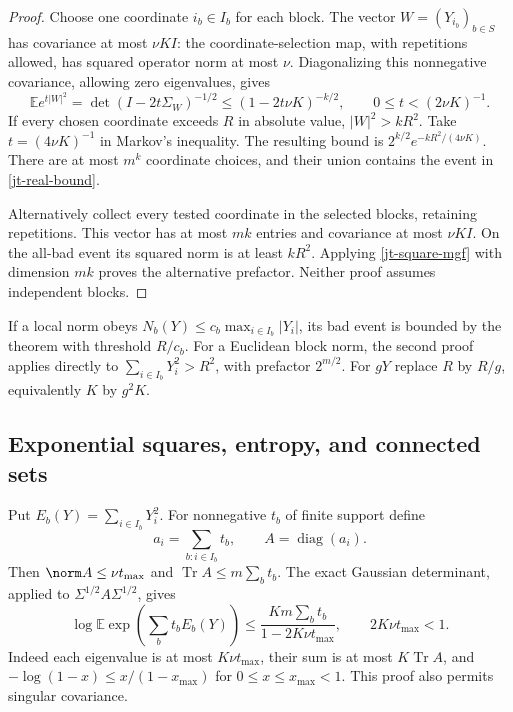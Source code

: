 \begin{proof}
Choose one coordinate $i_b\in I_b$ for each block. The vector
$W=(Y_{i_b})_{b\in S}$ has covariance at most $\nu K I$:
the coordinate-selection map, with repetitions allowed, has
squared operator norm at most $\nu$. Diagonalizing this
nonnegative covariance, allowing zero eigenvalues, gives
\begin{equation}\label{jt-square-mgf}
 \mathbb E e^{t|W|^2}
 =\det(I-2t\Sigma_W)^{-1/2}
 \le(1-2t\nu K)^{-k/2},\qquad 0\le t<(2\nu K)^{-1}.
\end{equation}
If every chosen coordinate exceeds $R$ in absolute value,
$|W|^2>kR^2$. Take $t=(4\nu K)^{-1}$ in Markov's inequality.
The resulting bound is $2^{k/2}e^{-kR^2/(4\nu K)}$.
There are at most $m^k$ coordinate choices, and their union
contains the event in \eqref{jt-real-bound}.

Alternatively collect every tested coordinate in the selected
blocks, retaining repetitions. This vector has at most $mk$
entries and covariance at most $\nu K I$. On the all-bad event
its squared norm is at least $kR^2$. Applying
\eqref{jt-square-mgf} with dimension $mk$ proves the alternative
prefactor. Neither proof assumes independent blocks.
\end{proof}

If a local norm obeys
$N_b(Y)\le c_b\max_{i\in I_b}|Y_i|$, its bad event is
bounded by the theorem with threshold $R/c_b$. For a Euclidean
block norm, the second proof applies directly to
$\sum_{i\in I_b}Y_i^2>R^2$, with prefactor $2^{m/2}$.
For $gY$ replace $R$ by $R/g$, equivalently $K$ by $g^2K$.

\subsection{Exponential squares, entropy, and connected sets}
\label{jt-entropy-section}

Put $E_b(Y)=\sum_{i\in I_b}Y_i^2$. For nonnegative $t_b$ of
finite support define
\[
 a_i=\sum_{b:i\in I_b}t_b,\qquad A=\operatorname{diag}(a_i).
\]
Then $\norm A\le\nu t_{\max}$ and
$\operatorname{Tr}A\le m\sum_b t_b$. The exact Gaussian
determinant, applied to $\Sigma^{1/2}A\Sigma^{1/2}$, gives
\begin{equation}\label{jt-exponential-square}
 \boxed{\quad
 \log\mathbb E\exp\!\left(\sum_b t_bE_b(Y)\right)
 \le\frac{Km\sum_b t_b}{1-2K\nu t_{\max}},
 \qquad 2K\nu t_{\max}<1.
 \quad}
\end{equation}
Indeed each eigenvalue is at most $K\nu t_{\max}$, their
sum is at most $K\operatorname{Tr}A$, and
$-\log(1-x)\le x/(1-x_{\max})$ for $0\le x\le x_{\max}<1$.
This proof also permits singular covariance.

